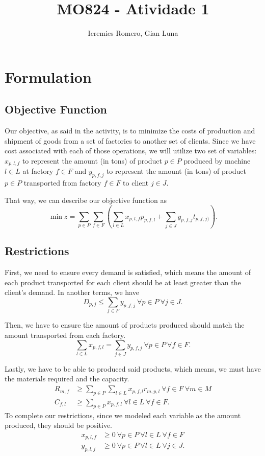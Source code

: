 \documentclass[11pt]{article}
\author{Ieremies Romero, Gian Luna}
\date{}
\title{MO824 - Atividade 1}
\theoremstyle{definition}
\theoremstyle{definition}
\theoremstyle{remark}
\theoremstyle{remark}
\theoremstyle{remark}
\theoremstyle{remark}
\theoremstyle{definition}
\begin{document}
\maketitle

\section*{Formulation}
\label{sec:org4712e53}
\subsection*{Objective Function}
\label{sec:org8c8f195}
Our objective, as said in the activity, is to minimize the costs of production and shipment of goods from a set of factories to another set of clients. Since we have cost associated with each of those operations, we will utilize two set of variables: \(x_{p,l,f}\) to represent the amount (in tons) of product \(p \in P\) produced by machine \(l \in L\) at factory \(f \in F\) and \(y_{p, f, j}\) to represent the amount (in tons) of product \(p \in P\) transported from factory \(f \in F\) to client \(j \in J\).

That way, we can describe our objective function as
\[ \min z = \sum \limits_{p \in P} \sum_{f \in F} (\sum \limits_{l \in L} x_{p,l,f}p_{p,f,l} + \sum_{j \in J} y_{p,f,j}t_{p,f,j)}). \]
\subsection*{Restrictions}
\label{sec:orgfa47c7e}
First, we need to ensure every demand is satisfied, which means the amount of each product transported for each client should be at least greater than the client's demand. In another terms, we have
\[ D_{p,j} \leq \sum_{f \in F} y_{p,f,j} \ \forall p \in P \ \forall j \in J. \]

Then, we have to ensure the amount of products produced should match the amount transported from each factory.
\[ \sum \limits_{l \in L} x_{p,f,l} = \sum_{j \in J} y_{p,f,j} \ \forall p \in P \ \forall f \in F . \]

Lastly, we have to be able to produced said products, which means, we must have the materials required and the capacity.
\begin{align*}
R_{m,f} &\geq \sum \limits_{p \in P} \sum \limits_{l \in L} x_{p,f,l}r_{m,p,l} \ \forall f \in F \ \forall m \in M \\
C_{f,l} &\geq \sum_{p \in P} x_{p,f,l} \ \forall l \in L \ \forall f \in F.
\end{align*}
To complete our restrictions, since we modeled each variable as the amount produced, they should be positive.
\begin{align*}
x_{p,l,f} &\geq 0 \ \forall p \in P \ \forall l \in L \ \forall f \in F \\
y_{p,l,j} &\geq 0 \ \forall p \in P \ \forall l \in L \ \forall j \in J.
\end{align*}
\end{document}
